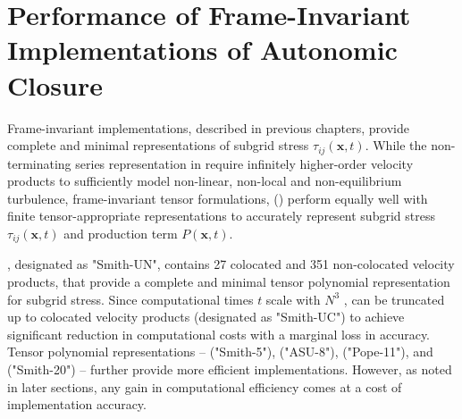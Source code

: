 \graphicspath{ {./Ch10/}  } 

%





%


\chapter{Performance of Frame-Invariant Implementations of Autonomic Closure}
\label{ch:10}



% 
Frame-invariant implementations, described in previous chapters, 
	provide complete and minimal representations
of subgrid stress $\tau_{ij}(\mathbf{x},t)$.
%
While the non-terminating series representation in   
require infinitely higher-order velocity products 
		to sufficiently model non-linear, non-local and non-equilibrium turbulence,
frame-invariant tensor formulations, 
		() 
perform equally well with finite tensor-appropriate representations
to accurately represent 
	subgrid stress $\tau_{ij}(\mathbf{x},t)$ 
	and production term $P(\mathbf{x},t)$.  

%
, 
designated as "Smith-UN", 
	contains 27 colocated 
	and 351 non-colocated velocity products, 
that provide a complete and minimal tensor polynomial representation 
for subgrid stress. 
%
Since computational times $t$ scale with $N^3$ ,
%
	 can be truncated up to colocated velocity products 
(designated as "Smith-UC") 
	to achieve significant reduction in computational costs
		with a marginal loss in accuracy. 
%
Tensor polynomial representations -- 
	 ("Smith-5"), 
	 ("ASU-8"), 
	 ("Pope-11"), and 
	 ("Smith-20") --
further provide more efficient implementations.
%
%
However, as noted in later sections,		
any gain in computational efficiency 
comes at a cost of implementation accuracy.


